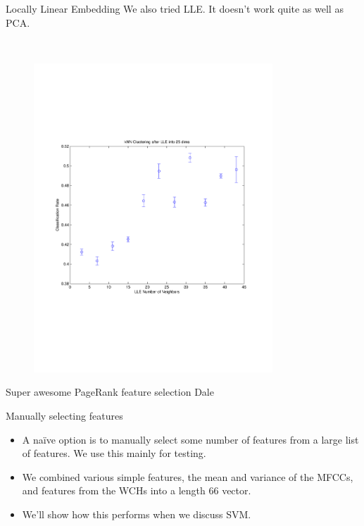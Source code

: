 \documentclass[xcolor=dvipsnames,t]{beamer} %
\begin{document}
\begin{frame}{Locally Linear Embedding}
   We also tried LLE.  It doesn't work quite as well as PCA.

   ~\\[-7em]
   \begin{figure}
      \centering
      \includegraphics[width=0.8\textwidth]{figures/optimkNNLLE.pdf}
   \end{figure}
\end{frame}

\begin{frame}{Super awesome PageRank feature selection}
Dale
\end{frame}

\begin{frame}{Manually selecting features}
   \begin{itemize}
      \item A na\"ive option is to manually select some number of features from a large list of features.  We use this mainly for testing.
      \item We combined various simple features, the mean and variance of the MFCCs, and features from the WCHs into a length $66$ vector.
      \item We'll show how this performs when we discuss SVM.
   \end{itemize}
\end{frame}
\end{document}
